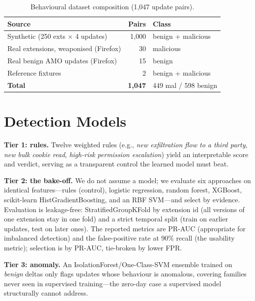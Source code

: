 \documentclass[conference]{IEEEtran}
\begin{document}
\begin{table}[t]
\caption{Behavioural dataset composition (1{,}047 update pairs).}
\label{tab:dataset}
\centering
\footnotesize
\begin{tabular}{@{}lrl@{}}
\toprule
\textbf{Source} & \textbf{Pairs} & \textbf{Class} \\
\midrule
Synthetic (250 exts $\times$ 4 updates) & 1{,}000 & benign + malicious \\
Real extensions, weaponised (Firefox) & 30 & malicious \\
Real benign AMO updates (Firefox) & 15 & benign \\
Reference fixtures & 2 & benign + malicious \\
\midrule
\textbf{Total} & \textbf{1{,}047} & 449 mal / 598 benign \\
\bottomrule
\end{tabular}
\end{table}

\section{Detection Models}
\noindent\textbf{Tier 1: rules.} Twelve weighted rules (e.g., \emph{new exfiltration flow to a
third party}, \emph{new bulk cookie read}, \emph{high-risk permission escalation}) yield an
interpretable score and verdict, serving as a transparent control the learned model must beat.

\noindent\textbf{Tier 2: the bake-off.} We do not assume a model; we evaluate six approaches on
identical features---rules (control), logistic regression, random forest, XGBoost, scikit-learn
HistGradientBoosting, and an RBF SVM---and select by evidence. Evaluation is leakage-free:
StratifiedGroupKFold by extension id (all versions of one extension stay in one fold) and a strict
temporal split (train on earlier updates, test on later ones). The reported metrics are PR-AUC
(appropriate for imbalanced detection) and the false-positive rate at 90\% recall (the usability
metric); selection is by PR-AUC, tie-broken by lower FPR.

\noindent\textbf{Tier 3: anomaly.} An IsolationForest/One-Class-SVM ensemble trained on
\emph{benign} deltas only flags updates whose behaviour is anomalous, covering families never seen
in supervised training---the zero-day case a supervised model structurally cannot address.
\end{document}
